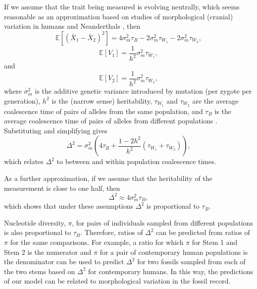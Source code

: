 \documentclass[]{article}
\newcommand{\E}{\mathbb{E}}
\begin{document}
If we assume that the trait being measured is evolving neutrally, which seems
reasonable as an approximation based on studies of morphological (cranial)
variation in humans and Neanderthals
\citep{Relethford1994-mh,Weaver2008-ho,Von_Cramon-Taubadel2009-zb}, then
\begin{equation}
    \E\left[\left(\bar{X}_1-\bar{X}_2\right)^2\right]=4\sigma_m^2\tau_B-2\sigma_m^2\tau_{W_1}-2\sigma_m^2\tau_{W_2},
\end{equation}
\begin{equation}
    \E\left[V_1\right]=\frac{1}{h^2}\sigma_m^2\tau_{W_1},
\end{equation}
and
\begin{equation}
    \E\left[V_2\right]=\frac{1}{h^2}\sigma_m^2\tau_{W_2},
\end{equation}
where $\sigma^2_m$ is the additive genetic variance introduced by mutation
(per zygote per generation), $h^2$ is the (narrow sense) heritability,
$\tau_{W_1}$ and $\tau_{W_2}$ are the average coalescence time of pairs
of alleles from the same population, and $\tau_B$ is the average coalescence
time of pairs of alleles from different populations
\citep{Whitlock1999-un,Weaver2016-id}.
Substituting and simplifying gives
\begin{equation}
    \Delta^2=\sigma_m^2 \left( 4\tau_B+\frac{1-2h^2}{h^2} \left( \tau_{W_1}+\tau_{W_2} \right) \right),
\end{equation}
which relates $\Delta^2$ to between and within population coalescence times.

As a further approximation, if we assume that the heritability of the
measurement is close to one half, then
\begin{equation}
    \Delta^2\approx4\sigma_m^2\tau_B,
\end{equation}
which shows that under these assumptions $\Delta^2$ is proportional to $\tau_B$.

Nucleotide diversity, $\pi$, for pairs of individuals sampled from different
populations is also proportional to $\tau_B$.
Therefore, ratios of $\Delta^2$ can be predicted from ratios of $\pi$
for the same comparisons.
For example, a ratio for which $\pi$ for Stem 1 and Stem 2 is the numerator
and $\pi$ for a pair of contemporary human populations is the denominator
can be used to predict $\Delta^2$ for two fossils sampled from each of the
two stems based on $\Delta^2$ for contemporary humans.
In this way, the predictions of our model can be related to morphological
variation in the fossil record.
\end{document}
